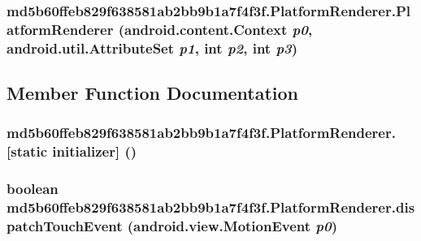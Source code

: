 \hypertarget{classmd5b60ffeb829f638581ab2bb9b1a7f4f3f_1_1_platform_renderer_e1eb78b8d56f9c8431b1bb5a8cd0f3a6}{
\subsubsection[{PlatformRenderer}]{\setlength{\rightskip}{0pt plus 5cm}md5b60ffeb829f638581ab2bb9b1a7f4f3f.PlatformRenderer.PlatformRenderer (android.content.Context {\em p0}, \/  android.util.AttributeSet {\em p1}, \/  int {\em p2}, \/  int {\em p3})}}
\label{classmd5b60ffeb829f638581ab2bb9b1a7f4f3f_1_1_platform_renderer_e1eb78b8d56f9c8431b1bb5a8cd0f3a6}




\subsection{Member Function Documentation}
\hypertarget{classmd5b60ffeb829f638581ab2bb9b1a7f4f3f_1_1_platform_renderer_19ebdb3686aa5e257fb7c4abf069ba7f}{
\subsubsection[{[static initializer]}]{\setlength{\rightskip}{0pt plus 5cm}md5b60ffeb829f638581ab2bb9b1a7f4f3f.PlatformRenderer.\mbox{[}static initializer\mbox{]} ()}}
\label{classmd5b60ffeb829f638581ab2bb9b1a7f4f3f_1_1_platform_renderer_19ebdb3686aa5e257fb7c4abf069ba7f}


\hypertarget{classmd5b60ffeb829f638581ab2bb9b1a7f4f3f_1_1_platform_renderer_3e5da660e483bb06f7cefffd8f570ab8}{
\subsubsection[{dispatchTouchEvent}]{\setlength{\rightskip}{0pt plus 5cm}boolean md5b60ffeb829f638581ab2bb9b1a7f4f3f.PlatformRenderer.dispatchTouchEvent (android.view.MotionEvent {\em p0})}}
\label{classmd5b60ffeb829f638581ab2bb9b1a7f4f3f_1_1_platform_renderer_3e5da660e483bb06f7cefffd8f570ab8}


